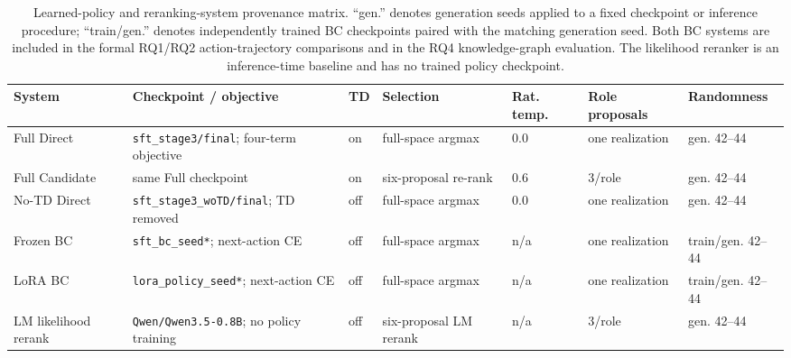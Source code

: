 \documentclass[manuscript,review,anonymous]{acmart}
\begin{document}
\begin{table}[t]
\centering
\small
\setlength{\tabcolsep}{3.5pt}
\begin{tabularx}{\textwidth}{@{}l>{\raggedright\arraybackslash}Xlllll@{}}
\toprule
System & Checkpoint / objective & TD & Selection & Rat. temp. & Role proposals & Randomness \\
\midrule
Full Direct & \texttt{sft\_stage3/final}; four-term objective & on & full-space argmax & 0.0 & one realization & gen. 42--44 \\
Full Candidate & same Full checkpoint & on & six-proposal re-rank & 0.6 & 3/role & gen. 42--44 \\
No-TD Direct & \texttt{sft\_stage3\_woTD/final}; TD removed & off & full-space argmax & 0.0 & one realization & gen. 42--44 \\
Frozen BC & \texttt{sft\_bc\_seed*}; next-action CE & off & full-space argmax & n/a & one realization & train/gen. 42--44 \\
LoRA BC & \texttt{lora\_policy\_seed*}; next-action CE & off & full-space argmax & n/a & one realization & train/gen. 42--44 \\
LM likelihood rerank & \texttt{Qwen/Qwen3.5-0.8B}; no policy training & off & six-proposal LM rerank & n/a & 3/role & gen. 42--44 \\
\bottomrule
\end{tabularx}
\caption{Learned-policy and reranking-system provenance matrix. ``gen.''
denotes generation seeds applied to a fixed checkpoint or inference procedure;
``train/gen.'' denotes independently trained BC checkpoints paired with the
matching generation seed. Both BC systems are included in the formal RQ1/RQ2
action-trajectory comparisons and in the RQ4 knowledge-graph evaluation. The likelihood reranker is an
inference-time baseline and has no trained policy checkpoint.}
\label{tab:system-provenance}
\end{table}
\end{document}
